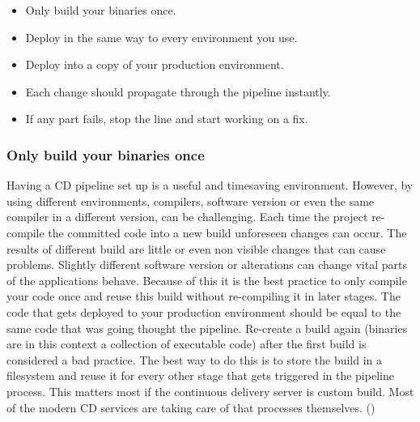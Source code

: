 \begin{itemize}
  \item Only build your binaries once.
  \item Deploy in the same way to every environment you use.
  \item Deploy into a copy of your production environment.
  \item Each change should propagate through the pipeline instantly.
  \item If any part fails, stop the line and start working on a fix.
\end{itemize} \cite{humble2010continuous}

\subsubsection{Only build your binaries once}
Having a CD pipeline set up is a useful and timesaving environment. However, by using different environments, compilers, software version or even the same
compiler in a different version, can be challenging. Each time the project re-compile the committed code into a new build unforeseen changes can occur.
The results of different build are little or even non visible changes that can cause problems. Slightly different software version or alterations can change
vital parts of the applications behave. Because of this it is the best practice to only compile your
code once and reuse this build without re-compiling it in later stages. The code that gets deployed to your production environment should be equal to the same
code that was going thought the pipeline. Re-create a build again (binaries are in this context a collection of executable code) after the first
build is considered a bad practice. The best way to do this is to store the build in a filesystem and reuse it for every other stage that gets triggered in the
pipeline process. This matters most if the continuous delivery server is custom build. Most of the modern CD services are taking care of that processes
themselves. (\cite{humble2010continuous})

